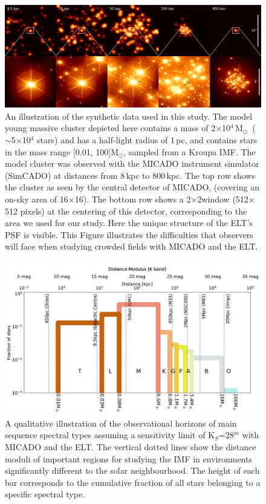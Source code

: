 \documentclass[referee]{aa}
\newcommand{\msun}{M$_\odot$~}
\newcommand{\msune}{M$_\odot$}
\begin{document}
\begin{figure}
    \centering
    \includegraphics[width=\textwidth]{5_clusters.pdf}
    \caption{An illustration of the synthetic data used in this study.
    The model young massive cluster depicted here contains a mass of 2$\times$10$^4$\,\msun ($\sim$5$\times$10$^4$ stars) and has a half-light radius of 1\,pc, and contains stars in the mass range [0.01, 100]\msune, sampled from a Kroupa IMF.
    The model cluster was observed with the MICADO instrument simulator (SimCADO) at distances from 8\,kpc to 800\,kpc.
    The top row shows the cluster as seen by the central detector of MICADO, (covering an on-sky area of 16\arcsec$\times$16\arcsec).
    The bottom row shows a 2\arcsec$\times$2\arcsec window (512$\times$512 pixels) at the centering of this detector, corresponding to the area we used for our study.
    Here the unique structure of the ELT's PSF is visible.
    This Figure illustrates the difficulties that observers will face when studying crowded fields with MICADO and the ELT.
    }
    \label{fig:5_clusters}
\end{figure}


\begin{figure}
    \centering
    \includegraphics[width=\textwidth]{imf_educational.pdf}
    \caption{A qualitative illustration of the observational horizons of main sequence spectral types assuming a sensitivity limit of K$_S$=28$^m$ with MICADO and the ELT.
    The vertical dotted lines show the distance moduli of important regions for studying the IMF in environments significantly different to the solar neighbourhood.
    The height of each bar corresponds to the cumulative fraction of all stars belonging to a specific spectral type.
    }
    \label{fig:imf_educational}
\end{figure}
\end{document}
